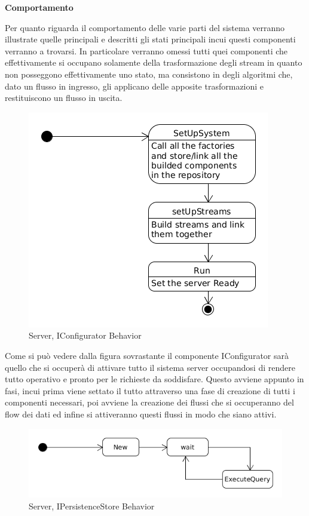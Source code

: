 \afterpage{\clearpage}

\newpage

\begin{center}
\textbf{Comportamento}
\end{center}

Per quanto riguarda il comportamento delle varie parti del sistema verranno illustrate quelle principali e descritti gli stati principali incui questi componenti verranno a trovarsi. In particolare verranno omessi tutti quei componenti che effettivamente si occupano solamente della trasformazione degli stream in quanto non posseggono effettivamente uno stato, ma consistono in degli algoritmi che, dato un flusso in ingresso, gli applicano delle apposite trasformazioni e restituiscono un flusso in uscita.

\begin{figure}[h]
\centering
\includegraphics[scale=0.5]{Figures/LogicArchitecture/Server/IConfiguratorBehavior}
\caption{Server, IConfigurator Behavior}
\end{figure}

Come si pu\`o vedere dalla figura sovrastante il componente IConfigurator sar\`a quello che si occuper\`a di attivare tutto il sistema server occupandosi di rendere tutto operativo e pronto per le richieste da soddisfare. Questo avviene appunto in fasi, incui prima viene settato il tutto attraverso una fase di creazione di tutti i componenti necessari, poi avviene la creazione dei flussi che si occuperanno del flow dei dati ed infine si attiveranno questi flussi in modo che siano attivi.

\begin{figure}[h]
\centering
\includegraphics[width=\textwidth]{Figures/LogicArchitecture/Server/IPersistenceStoreBehavior}
\caption{Server, IPersistenceStore Behavior}
\end{figure}


